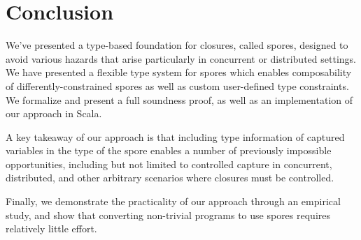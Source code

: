 \documentclass[runningheads]{llncs}
\begin{document}
\begin{sloppypar}




\section{Conclusion}
\label{sec:conclusion}

We've presented a type-based foundation for closures, called spores, designed
to avoid various hazards that arise particularly in concurrent or distributed
settings. We have presented a flexible type system for spores which enables
composability of differently-constrained spores as well as custom user-defined
type constraints. We formalize and present a full soundness proof, as well as
an implementation of our approach in Scala.

A key takeaway of our approach is that including type information of captured
variables in the type of the spore enables a number of previously impossible
opportunities, including but not limited to controlled capture in concurrent,
distributed, and other arbitrary scenarios where closures must be
controlled.

Finally, we demonstrate the practicality of our approach through an
empirical study, and show that converting non-trivial
programs to use spores requires relatively little effort.








\end{sloppypar}
\end{document}
